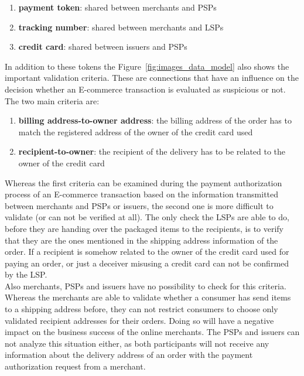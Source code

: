 \begin{enumerate}
  \item \textbf{payment token}: shared between merchants and \gls{PSP}s
  \item \textbf{tracking number}: shared between merchants and \gls{LSP}s
  \item \textbf{credit card}: shared between issuers and \gls{PSP}s
\end{enumerate}

In addition to these tokens the Figure~\ref{fig:images_data_model} also shows the important validation criteria. These are connections that have an influence on the decision whether an \gls{E-commerce} transaction is evaluated as suspicious or not. The two main criteria are: \@

\begin{enumerate}
  \item \textbf{billing address-to-owner address}: the billing address of the order has to match the registered address of the owner of the credit card used
  \item \textbf{recipient-to-owner}: the recipient of the delivery has to be related to the owner of the credit card
\end{enumerate}

Whereas the first criteria can be examined during the payment authorization process of an \gls{E-commerce} transaction based on the information transmitted between merchants and \gls{PSP}s or issuers, the second one is more difficult to validate (or can not be verified at all). The only check the \gls{LSP}s are able to do, before they are handing over the packaged items to the recipients, is to verify that they are the ones mentioned in the shipping address information of the order. If a recipient is somehow related to the owner of the credit card used for paying an order, or just a deceiver misusing a credit card can not be confirmed by the \gls{LSP}. \\

Also merchants, \gls{PSP}s and issuers have no possibility to check for this criteria. Whereas the merchants are able to validate whether a consumer has send items to a shipping address before, they can not restrict consumers to choose only validated recipient addresses for their orders. Doing so will have a negative impact on the business success of the online merchants. The \gls{PSP}s and issuers can not analyze this situation either, as both participants will not receive any information about the delivery address of an order with the payment authorization request from a merchant.

